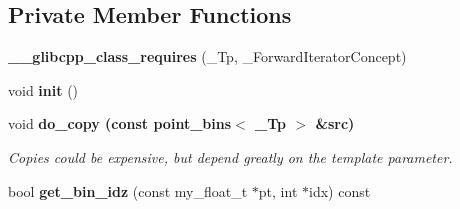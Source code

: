 \subsection*{Private Member Functions}
\begin{CompactItemize}
\item 
\textbf{\_\-\_\-glibcpp\_\-class\_\-requires} (\_\-Tp, \_\-Forward\-Iterator\-Concept)\label{classSimSite3D_1_1point__bins_59eab23f4ede0549e5ca1a44b58f9588}

\item 
void \textbf{init} ()\label{classSimSite3D_1_1point__bins_2de8967933c976d7e8569695ced43111}

\item 
void \bf{do\_\-copy} (const \bf{point\_\-bins}$<$ \_\-Tp $>$ \&src)
\begin{CompactList}\small\item\em Copies could be expensive, but depend greatly on the template parameter. \item\end{CompactList}\item 
bool \textbf{get\_\-bin\_\-idz} (const my\_\-float\_\-t $\ast$pt, int $\ast$idx) const \label{classSimSite3D_1_1point__bins_1a6812d16a3aed4df67ea89b4ef3795b}

\end{CompactItemize}
